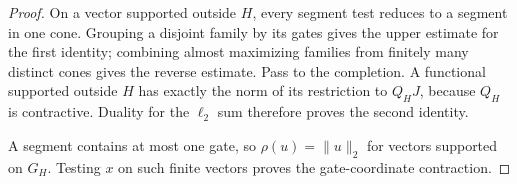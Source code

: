 \begin{proof}
On a vector supported outside $H$, every segment test reduces to a
segment in one cone. Grouping a disjoint family by its gates gives the
upper estimate for the first identity; combining almost maximizing
families from finitely many distinct cones gives the reverse estimate.
Pass to the completion. A functional supported outside $H$ has exactly
the norm of its restriction to $Q_HJ$, because $Q_H$ is contractive.
Duality for the $\ell_2$ sum therefore proves the second identity.

A segment contains at most one gate, so $\rho(u)=\|u\|_2$ for
vectors supported on $G_H$. Testing $x$ on such finite vectors proves
the gate-coordinate contraction.
\end{proof}
